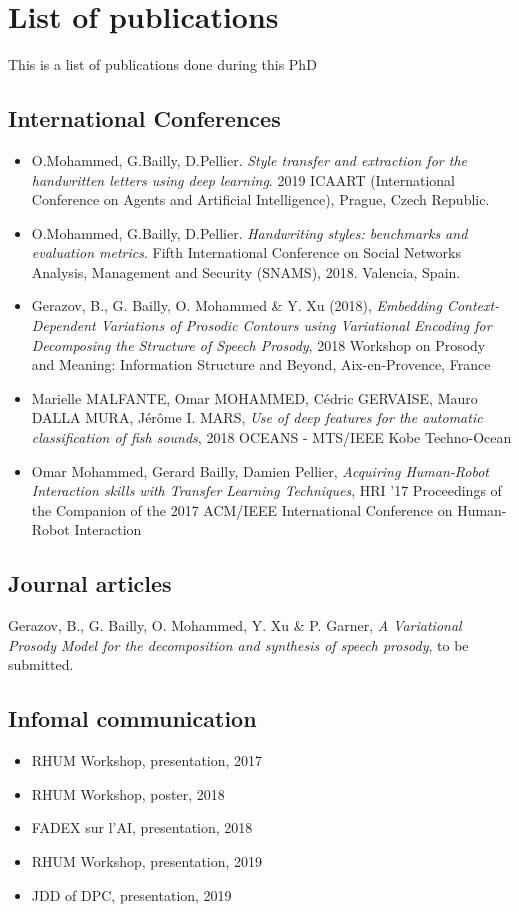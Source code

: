 \chapter{List of publications}
This is a list of publications done during this PhD

\section{International Conferences}

\begin{itemize}
  \item O.Mohammed, G.Bailly, D.Pellier. \textit{Style transfer and extraction for the handwritten letters using deep learning}. 2019 ICAART (International Conference on Agents and Artificial Intelligence), Prague, Czech Republic.
  \item O.Mohammed, G.Bailly, D.Pellier. \textit{Handwriting styles: benchmarks and evaluation metrics}. Fifth International Conference on Social Networks Analysis, Management and Security (SNAMS), 2018. Valencia, Spain.
  \item Gerazov, B., G. Bailly, O. Mohammed & Y. Xu (2018), \textit{Embedding Context-Dependent Variations of Prosodic Contours using Variational Encoding for Decomposing the Structure of Speech Prosody}, 2018 Workshop on Prosody and Meaning: Information Structure and Beyond, Aix-en-Provence, France
  \item Marielle MALFANTE, Omar MOHAMMED, Cédric GERVAISE, Mauro DALLA MURA, Jérôme I. MARS, \textit{Use of deep features for the automatic classification of fish sounds}, 2018 OCEANS - MTS/IEEE Kobe Techno-Ocean
  \item Omar Mohammed, Gerard Bailly, Damien Pellier, \textit{Acquiring Human-Robot Interaction skills with Transfer Learning Techniques}, HRI '17 Proceedings of the Companion of the 2017 ACM/IEEE International Conference on Human-Robot Interaction
\end{itemize}

\section{Journal articles}
\item Gerazov, B., G. Bailly, O. Mohammed, Y. Xu & P. Garner, \textit{A Variational Prosody Model for the decomposition and synthesis of speech prosody}, to be submitted.

\section{Infomal communication}
\begin{itemize}
  \item RHUM Workshop, presentation, 2017
  \item RHUM Workshop, poster, 2018
  \item FADEX sur l'AI, presentation, 2018
  \item RHUM Workshop, presentation, 2019
  \item JDD of DPC, presentation, 2019
\end{itemize}
